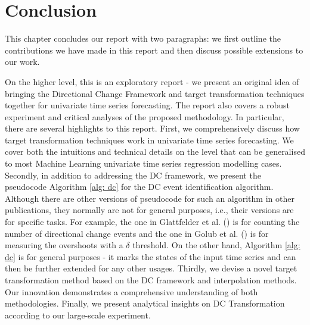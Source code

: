 \chapter{Conclusion}\label{ch: conclusion}
This chapter concludes our report with two paragraphs: we first outline the contributions we have made in this report and then discuss possible extensions to our work.

On the higher level, this is an exploratory report - we present an original idea of bringing the Directional Change Framework and target transformation techniques together for univariate time series forecasting. The report also covers a robust experiment and critical analyses of the proposed methodology. In particular, there are several highlights to this report. First, we comprehensively discuss how target transformation techniques work in univariate time series forecasting. We cover both the intuitions and technical details on the level that can be generalised to most Machine Learning univariate time series regression modelling cases. Secondly, in addition to addressing the DC framework, we present the pseudocode Algorithm \ref{alg: dc} for the DC event identification algorithm. Although there are other versions of pseudocode for such an algorithm in other publications, they normally are not for general purposes, i.e., their versions are for specific tasks. For example, the one in Glattfelder et al. (\citeyear{glattfelder2011patterns}) is for counting the number of directional change events and the one in Golub et al. (\citeyear{golub2016multi}) is for measuring the overshoots with a $\delta$ threshold. On the other hand, Algorithm \ref{alg: dc} is for general purposes - it marks the states of the input time series and can then be further extended for any other usages. Thirdly, we devise a novel target transformation method based on the DC framework and interpolation methods. Our innovation demonstrates a comprehensive understanding of both methodologies. Finally, we present analytical insights on DC Transformation according to our large-scale experiment.

